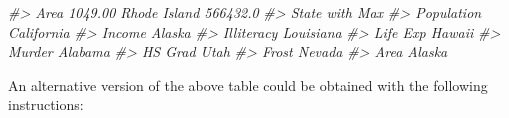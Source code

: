 \documentclass[
]{book}
\newenvironment{Shaded}{\begin{snugshade}}{\end{snugshade}}
\newcommand{\CommentTok}[1]{\textcolor[rgb]{0.56,0.35,0.01}{\textit{#1}}}
\begin{document}
\begin{Shaded}
\begin{Highlighting}[]
\CommentTok{\#\textgreater{} Area       1049.00   Rhode Island      566432.0}
\CommentTok{\#\textgreater{}            State with Max}
\CommentTok{\#\textgreater{} Population     California}
\CommentTok{\#\textgreater{} Income             Alaska}
\CommentTok{\#\textgreater{} Illiteracy      Louisiana}
\CommentTok{\#\textgreater{} Life Exp           Hawaii}
\CommentTok{\#\textgreater{} Murder            Alabama}
\CommentTok{\#\textgreater{} HS Grad              Utah}
\CommentTok{\#\textgreater{} Frost              Nevada}
\CommentTok{\#\textgreater{} Area               Alaska}
\end{Highlighting}
\end{Shaded}

An alternative version of the above table could be obtained with the following instructions:
\end{document}
